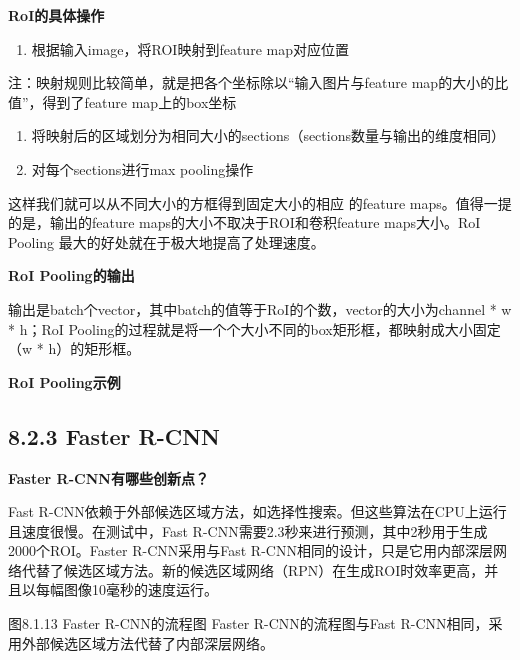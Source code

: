 \textbf{RoI的具体操作}

\begin{enumerate}
\def\labelenumi{\arabic{enumi}.}
\item
  根据输入image，将ROI映射到feature map对应位置
\end{enumerate}

注：映射规则比较简单，就是把各个坐标除以``输入图片与feature
map的大小的比值''，得到了feature map上的box坐标

\begin{enumerate}
\def\labelenumi{\arabic{enumi}.}
\setcounter{enumi}{1}
\item
  将映射后的区域划分为相同大小的sections（sections数量与输出的维度相同）
\item
  对每个sections进行max pooling操作
\end{enumerate}

这样我们就可以从不同大小的方框得到固定大小的相应 的feature
maps。值得一提的是，输出的feature maps的大小不取决于ROI和卷积feature
maps大小。RoI Pooling 最大的好处就在于极大地提高了处理速度。

\textbf{RoI Pooling的输出}

输出是batch个vector，其中batch的值等于RoI的个数，vector的大小为channel *
w * h；RoI
Pooling的过程就是将一个个大小不同的box矩形框，都映射成大小固定（w *
h）的矩形框。

\textbf{RoI Pooling示例}

\begin{figure}
\centering
\caption{}
\end{figure}

\subsection{8.2.3 Faster R-CNN}\label{faster-r-cnn}

\textbf{Faster R-CNN有哪些创新点？}

Fast
R-CNN依赖于外部候选区域方法，如选择性搜索。但这些算法在CPU上运行且速度很慢。在测试中，Fast
R-CNN需要2.3秒来进行预测，其中2秒用于生成2000个ROI。Faster
R-CNN采用与Fast
R-CNN相同的设计，只是它用内部深层网络代替了候选区域方法。新的候选区域网络（RPN）在生成ROI时效率更高，并且以每幅图像10毫秒的速度运行。

图8.1.13 Faster R-CNN的流程图 Faster R-CNN的流程图与Fast
R-CNN相同，采用外部候选区域方法代替了内部深层网络。

